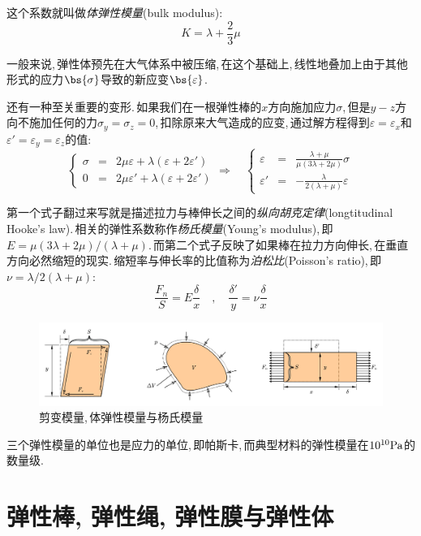 这个系数就叫做\emph{体弹性模量}(bulk modulus):
\[K=\lambda+\frac{2}{3}\mu\]

一般来说,\,弹性体预先在大气体系中被压缩,\,在这个基础上,\,线性地叠加上由于其他形式的应力$\bs{\sigma}$导致的新应变$\bs{\varepsilon}$.\,

还有一种至关重要的变形.\,如果我们在一根弹性棒的$x$方向施加应力$\sigma$,\,但是$y-z$方向不施加任何的力$\sigma_y=\sigma_z=0$,\,扣除原来大气造成的应变,\,通过解方程得到$\varepsilon=\varepsilon_x$和$\varepsilon'=\varepsilon_y=\varepsilon_z$的值:
\[\left\{\begin{array}{ccc}\sigma &=&2\mu\varepsilon + \lambda(\varepsilon+2\varepsilon') \\ 0 &=&2\mu\varepsilon' + \lambda(\varepsilon+2\varepsilon')\end{array}\right.\Rightarrow\quad \left\{\begin{array}{ccc}\varepsilon &=& \frac{\lambda+\mu}{\mu(3\lambda+2\mu)} \sigma\\ \varepsilon' &=&-\frac{\lambda}{2(\lambda+\mu)}\varepsilon\end{array}\right.\]

第一个式子翻过来写就是描述拉力与棒伸长之间的\emph{纵向胡克定律}(longtitudinal Hooke's law).\,相关的弹性系数称作\emph{杨氏模量}(Young's modulus),\,即$E=\mu(3\lambda+2\mu)/(\lambda+\mu)$.\,而第二个式子反映了如果棒在拉力方向伸长,\,在垂直方向必然缩短的现实.\,缩短率与伸长率的比值称为\emph{泊松比}(Poisson's ratio),\,即$\nu=\lambda/2(\lambda+\mu)$:
\[\frac{F_n}{S}=E\frac{\delta}{x}\quad ,\quad \frac{\delta'}{y}=\nu\frac{\delta}{x}\]

\begin{figure}[H]
\centering
\includegraphics[width=14cm]{image/6-7-3.png}
\caption{剪变模量,\,体弹性模量与杨氏模量}
\end{figure}

三个弹性模量的单位也是应力的单位,\,即帕斯卡,\,而典型材料的弹性模量在$10^{10}{\rm Pa}$的数量级.


\section{弹性棒, 弹性绳, 弹性膜与弹性体}


